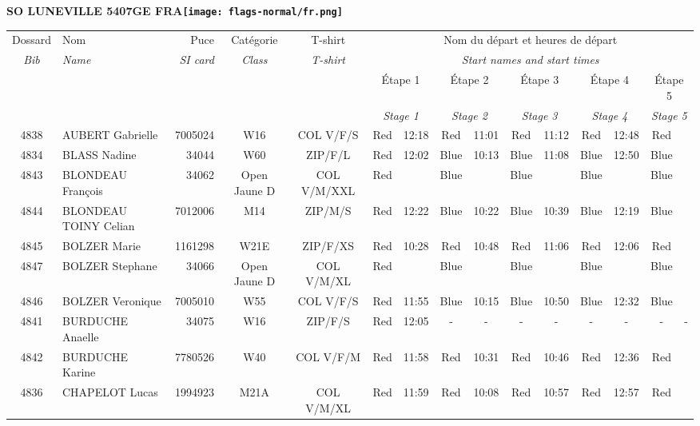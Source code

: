 \documentclass{report}
\begin{document}
\newpage
  \Huge \centering \bfseries SO LUNEVILLE 5407GE FRA\normalfont \footnotesize \sffamily \hfill \texttt{[image: flags-normal/fr.png]} \newline 
  \begin{longtable}{|c|l|r|c|c|*{5}{cc|}}
    Dossard & Nom  & Puce    & Catégorie & T-shirt & \multicolumn{10}{c|}{Nom du départ et heures de départ} \\
    \itshape Bib     & \itshape Name & \itshape SI card & \itshape Class  & \itshape  T-shirt  & \multicolumn{10}{c|}{\itshape Start names and start times} \\
    \hline
    & & & & & \multicolumn{2}{c|}{Étape 1} & \multicolumn{2}{c|}{Étape 2} & \multicolumn{2}{c|}{Étape 3} & \multicolumn{2}{c|}{Étape 4} & \multicolumn{2}{c|}{Étape 5} \\
    & & & & & \multicolumn{2}{c|}{\itshape Stage 1} & \multicolumn{2}{c|}{\itshape Stage 2} & \multicolumn{2}{c|}{\itshape Stage 3} & \multicolumn{2}{c|}{\itshape Stage 4} & \multicolumn{2}{c|}{\itshape Stage 5} \\
    \hline
    4838 & AUBERT Gabrielle & 7005024 & W16 & COL V/F/S & Red & 12:18 & Red & 11:01 & Red & 11:12 & Red & 12:48 & Red &  \\
    4834 & BLASS Nadine & 34044 & W60 & ZIP/F/L & Red & 12:02 & Blue & 10:13 & Blue & 11:08 & Blue & 12:50 & Blue &  \\
    4843 & BLONDEAU François & 34062 & Open Jaune D & COL V/M/XXL & Red &   & Blue &   & Blue &   & Blue &   & Blue &  \\
    4844 & BLONDEAU TOINY Celian & 7012006 & M14 & ZIP/M/S & Red & 12:22 & Blue & 10:22 & Blue & 10:39 & Blue & 12:19 & Blue &  \\
    4845 & BOLZER Marie & 1161298 & W21E & ZIP/F/XS & Red & 10:28 & Red & 10:48 & Red & 11:06 & Red & 12:06 & Red &  \\
    4847 & BOLZER Stephane & 34066 & Open Jaune D & COL V/M/XL & Red &   & Blue &   & Blue &   & Blue &   & Blue &  \\
    4846 & BOLZER Veronique & 7005010 & W55 & COL V/F/S & Red & 11:55 & Blue & 10:15 & Blue & 10:50 & Blue & 12:32 & Blue &  \\
    4841 & BURDUCHE Anaelle & 34075 & W16 & ZIP/F/S & Red & 12:05 & - &  - & - &  - & - &  - & - &  -\\
    4842 & BURDUCHE Karine & 7780526 & W40 & COL V/F/M & Red & 11:58 & Red & 10:31 & Red & 10:46 & Red & 12:36 & Red &  \\
    4836 & CHAPELOT Lucas & 1994923 & M21A & COL V/M/XL & Red & 11:59 & Red & 10:08 & Red & 10:57 & Red & 12:57 & Red &  \\

\end{longtable}
\end{document}

